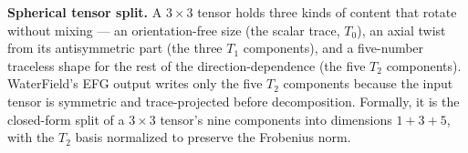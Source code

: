 \documentclass[11pt]{article}
\begin{document}
\textbf{Spherical tensor split.} A \(3\times3\) tensor holds three kinds of
content that rotate without mixing --- an orientation-free size (the scalar
trace, \(T_0\)), an axial twist from its antisymmetric part (the three \(T_1\)
components), and a five-number traceless shape for the rest of the
direction-dependence (the five \(T_2\) components). WaterField's EFG output
writes only the five \(T_2\) components because the input tensor is symmetric and
trace-projected before decomposition. Formally, it is the closed-form split of a
\(3\times3\) tensor's nine components into dimensions \(1+3+5\), with the \(T_2\)
basis normalized to preserve the Frobenius norm.
\end{document}
